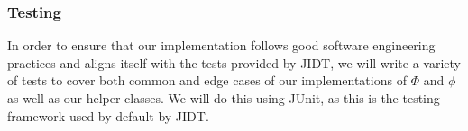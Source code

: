 \documentclass[a4paper,11pt]{article}
\begin{document}
\subsubsection{Testing}
In order to ensure that our implementation follows good software engineering practices and aligns itself with the tests provided by JIDT, we will write a variety of tests to cover both common and edge cases of our implementations of $\Phi$ and $\phi$ as well as our helper classes. We will do this using JUnit, as this is the testing framework used by default by JIDT.


\clearpage
{}

\clearpage
\end{document}
